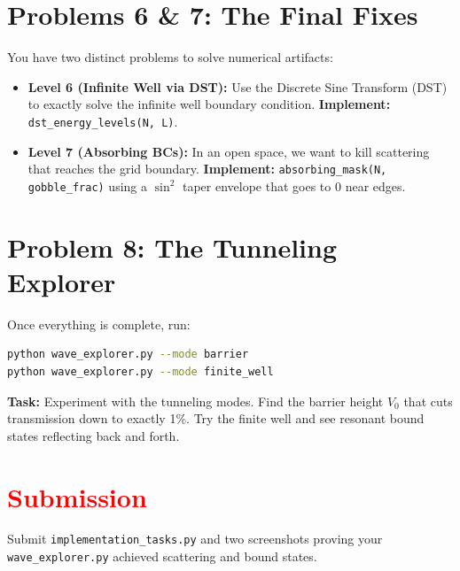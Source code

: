\documentclass[11pt]{article}
\begin{document}
\section*{Problems 6 \& 7: The Final Fixes}

You have two distinct problems to solve numerical artifacts:
\begin{itemize}
    \item \textbf{Level 6 (Infinite Well via DST):} Use the Discrete Sine Transform (DST) to exactly solve the infinite well boundary condition. \textbf{Implement:} \lstinline|dst_energy_levels(N, L)|.
    \item \textbf{Level 7 (Absorbing BCs):} In an open space, we want to kill scattering that reaches the grid boundary. \textbf{Implement:} \lstinline|absorbing_mask(N, gobble_frac)| using a $\sin^2$ taper envelope that goes to 0 near edges.
\end{itemize}


\section*{Problem 8: The Tunneling Explorer}

Once everything is complete, run:
\begin{lstlisting}[language=bash]
python wave_explorer.py --mode barrier
python wave_explorer.py --mode finite_well
\end{lstlisting}

\textbf{Task:} Experiment with the tunneling modes. Find the barrier height $V_0$ that cuts transmission down to exactly 1\%. Try the finite well and see resonant bound states reflecting back and forth.

\section*{\textcolor{red}{Submission}}
Submit \texttt{implementation\_tasks.py} and two screenshots proving your \lstinline|wave_explorer.py| achieved scattering and bound states.
\end{document}
